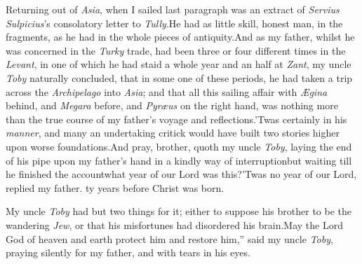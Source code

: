 \documentclass{article}
\begin{document}
\indent\lqq Returning out of \textit{Asia}, when I sailed\break
{}\break
{}\break
{}\break
{}\break
{}\break
{}\break
{}\break
{}\break
{}\break
{}\break
{}\break
{}\break
{}\break
{}
\newpage
\noindent
{}
last paragraph was an extract of \textit{Servius
Sulpicius}’s consolatory letter to \textit{Tully}.\tsk He had as
little skill, honest man, in the fragments, as he had in the
whole pieces of antiquity.\tsk And as my father, whilst he
was concerned in the \textit{Turky} trade, had been three
or four different times in the \textit{Levant}, in one of
which he had staid a whole year and an half at
\textit{Zant}, my uncle \textit{Toby} naturally concluded,
that in some one of these periods, he had taken a trip
across the \textit{Archipelago} into \textit{Asia}; and that
all this sailing affair with \textit{Ægina} behind, and
\textit{Megara} before, and \textit{Pyræus} on the right
hand, \etc \etc was nothing more than the true course of my
father’s voyage and reflections.\tsk ’Twas certainly in his
\textit{manner}, and many an undertaking critick would have
built two stories higher upon worse foundations.\tsk And
pray, brother, quoth my uncle \textit{Toby}, laying the end
of his pipe upon my father’s hand in a kindly way of
interruption\tsk but waiting till he finished the
account\tsk what year of our Lord was this?\tsk ’Twas no
year of our Lord, replied my father.\break
{}
ty years before Christ was born.

My uncle \textit{Toby} had but two things for it; either to
suppose his brother to be the wandering \textit{Jew}, or that his
misfortunes had disordered his brain.\tsk \lqq May\break
\lqq the Lord God of heaven and earth\break
\lqq protect him and restore him,” said my\break
uncle \textit{Toby}, praying silently for my father, and
with tears in his eyes.
\end{document}

